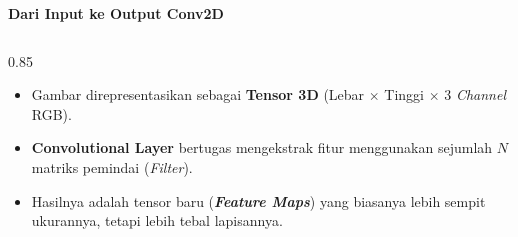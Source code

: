 \documentclass{beamer}
\begin{document}
\begin{frame}{\textbf{Dari Input ke Output Conv2D}}
\begin{tikzpicture}[>=stealth, scale=0.8, transform shape]
    \end{tikzpicture}
    
    \vspace{0.3cm}
    \begin{columns}
        \begin{column}{0.85\textwidth}
            \begin{itemize}
                \item Gambar direpresentasikan sebagai \textbf{Tensor 3D} (Lebar $\times$ Tinggi $\times$ 3 \textit{Channel} RGB).
                \item \textbf{Convolutional Layer} bertugas mengekstrak fitur menggunakan sejumlah $N$ matriks pemindai (\textit{Filter}).
                \item Hasilnya adalah tensor baru (\textbf{\textit{Feature Maps}}) yang biasanya lebih sempit ukurannya, tetapi lebih tebal lapisannya.
            \end{itemize}
        \end{column}
    \end{columns}
\end{frame}
\end{document}

